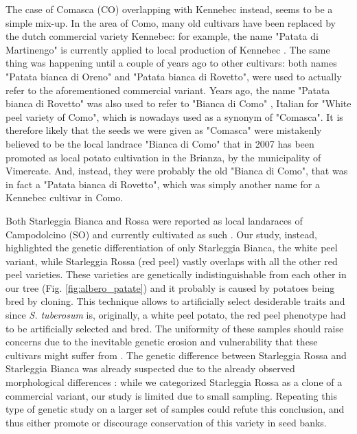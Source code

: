 \documentclass[a4paper, 12pt]{report}
\begin{document}
The case of Comasca (CO) overlapping with Kennebec instead, seems to be a simple mix-up. In the area of Como, many old cultivars have been replaced by the dutch commercial variety Kennebec: for example, the name "Patata di Martinengo" is currently applied to local production of Kennebec \parencite{rossiVarietaAgronomicheLombarde2019}. The same thing was happening until a couple of years ago to other cultivars: both names "Patata bianca di Oreno" and "Patata bianca di Rovetto", were used to actually refer to the aforementioned commercial variant. Years ago, the name "Patata bianca di Rovetto" was also used to refer to "Bianca di Como" \parencite{rossiVarietaAgronomicheLombarde2019}, Italian for "White peel variety of Como", which is nowadays used as a synonym of  "Comasca". It is therefore likely that the seeds we were given as "Comasca" were mistakenly believed to be the local landrace "Bianca di Como" that in 2007 has been promoted as local potato cultivation in the Brianza, by the municipality of Vimercate. And, instead, they were probably the old "Bianca di Como", that was in fact a "Patata bianca di Rovetto", which was simply another name for a Kennebec cultivar in Como.

Both Starleggia Bianca and Rossa were reported as local landaraces of Campodolcino (SO) \parencite{rossiVarietaAgronomicheLombarde2019} and currently cultivated as such \parencite{veginiPatateTradizionaliLocali2022}. Our study, instead, highlighted the genetic differentiation of only Starleggia Bianca, the white peel variant, while Starleggia Rossa (red peel) vastly overlaps with all the other red peel varieties. These varieties are genetically indistinguishable from each other in our tree (Fig. \ref{fig:albero_patate}) and it probably is caused by potatoes being bred by cloning. This technique allows to artificially select desiderable traits and since \textit{S. tuberosum} is, originally, a white peel potato, the red peel phenotype had to be artificially selected and bred. The uniformity of these samples should raise concerns due to the inevitable genetic erosion and vulnerability that these cultivars might suffer from \parencite{salgotraGeneticDiversityConservation2023}. The genetic difference between Starleggia Rossa and Starleggia Bianca was already suspected due to the already observed morphological differences \parencite{rossiVarietaAgronomicheLombarde2019}: while we categorized Starleggia Rossa as a clone of a commercial variant, our study is limited due to small sampling. Repeating this type of genetic study on a larger set of samples could refute this conclusion, and thus either promote or discourage conservation of this variety in seed banks.
\end{document}
